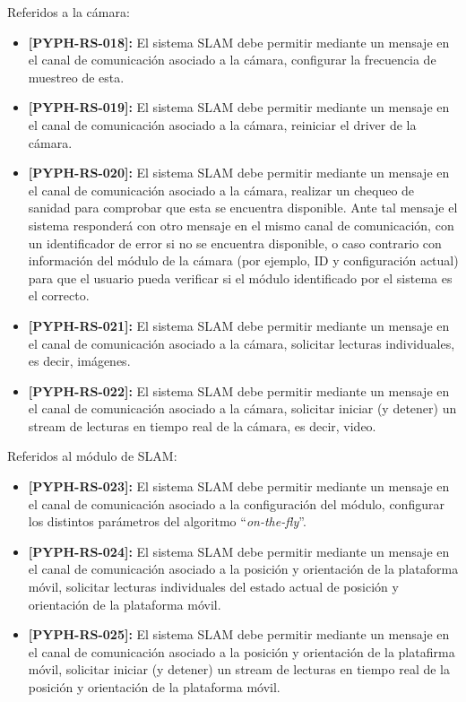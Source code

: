 \documentclass[12pt,a4paper, twosite]{article}
\begin{document}
Referidos a la cámara:

\begin{itemize}
  \item \textbf{[PYPH-RS-018]:} El sistema SLAM debe permitir mediante un mensaje en el canal de
  comunicación asociado a la cámara, configurar la frecuencia de muestreo de esta.
  \item \textbf{[PYPH-RS-019]:} El sistema SLAM debe permitir mediante un mensaje en el canal de
  comunicación asociado a la cámara, reiniciar el driver de la cámara.
  \item \textbf{[PYPH-RS-020]:} El sistema SLAM debe permitir mediante un mensaje en el canal de
  comunicación asociado a la cámara, realizar un chequeo de sanidad para comprobar que esta se
  encuentra disponible. Ante tal mensaje el sistema responderá con otro mensaje en el mismo
  canal de comunicación, con un identificador de error si no se encuentra disponible, o caso
  contrario con información del módulo de la cámara (por ejemplo, ID y configuración actual) 
  para que el usuario pueda verificar si el módulo identificado por el sistema es el correcto.
  \item \textbf{[PYPH-RS-021]:} El sistema SLAM debe permitir mediante un mensaje en el canal de
  comunicación asociado a la cámara, solicitar lecturas individuales, es decir, imágenes.
  \item \textbf{[PYPH-RS-022]:} El sistema SLAM debe permitir mediante un mensaje en el canal de
  comunicación asociado a la cámara, solicitar iniciar (y detener) un stream de lecturas en
  tiempo real de la cámara, es decir, video.
\end{itemize}

Referidos al módulo de SLAM:

\begin{itemize}
  \item \textbf{[PYPH-RS-023]:} El sistema SLAM debe permitir mediante un mensaje en el canal de
  comunicación asociado a la configuración del módulo, configurar los distintos parámetros del
  algoritmo ``\textit{on-the-fly}''.
  \item \textbf{[PYPH-RS-024]:} El sistema SLAM debe permitir mediante un mensaje en el canal de
  comunicación asociado a la posición y orientación de la plataforma móvil, solicitar lecturas individuales del estado actual de posición y orientación de la plataforma móvil.
  \item \textbf{[PYPH-RS-025]:} El sistema SLAM debe permitir mediante un mensaje en el canal de
  comunicación asociado a la posición y orientación de la platafirma móvil, solicitar iniciar
  (y detener) un stream de lecturas en tiempo real de la posición y orientación de la plataforma
  móvil.
\end{itemize}
\end{document}
